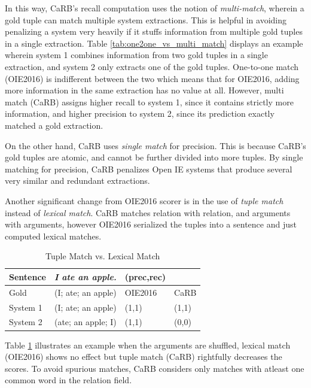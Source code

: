     In this way, CaRB's recall computation uses the notion of {\em multi-match}, wherein a gold tuple can match multiple system extractions. This is helpful in avoiding penalizing a system very heavily if it stuffs information from multiple gold tuples in a single extraction. Table \ref{tab:one2one_vs_multi_match} displays an example wherein system 1 combines information from two gold tuples in a single extraction, and system 2 only extracts one of the gold tuples. One-to-one match (OIE2016) is indifferent between the two which means that for OIE2016, adding more information in the same extraction has no value at all. However, multi match (CaRB) assigns higher recall to system 1, since it contains strictly more information, and higher precision to system 2, since its prediction exactly matched a gold extraction. 

    On the other hand, CaRB uses {\em single match} for precision. This is because CaRB’s gold tuples are atomic, and cannot be further divided into more tuples. By single matching for precision, CaRB penalizes Open IE systems that produce several very similar and redundant extractions.

    Another significant change from OIE2016 scorer is in the use of {\em tuple match} instead of {\em lexical match}. CaRB matches relation with relation, and arguments with arguments, however OIE2016 serialized the tuples into a sentence and just computed lexical matches. 
    
    \begin{table}[h]
        \centering
        {\small
        \begin{tabular}{|l|l|l|l|} 
        \hline
        Sentence & {\em I ate an apple.}    & \multicolumn{1}{l}{(prec,rec)} &        \\ 
        \hline
        Gold     & (I; ate; an apple) & OIE2016                        & CaRB   \\ 
        \hline
        System 1 & (I; ate; an apple) & (1,1)                          & (1,1)  \\ 
        \hline
        System 2 & (ate; an apple; I) & (1,1)                          & (0,0)  \\
        \hline
        \end{tabular}
        \caption{Tuple Match vs. Lexical Match}
        \label{tab:tuple_vs_lexical_match}
        }
        \vspace*{-2ex}
    \end{table}

    Table \ref{tab:tuple_vs_lexical_match} illustrates an example when the arguments are shuffled, lexical match (OIE2016) shows no effect but tuple match (CaRB) rightfully decreases the scores. To avoid spurious matches, CaRB considers only matches with atleast one common word in the relation field.

